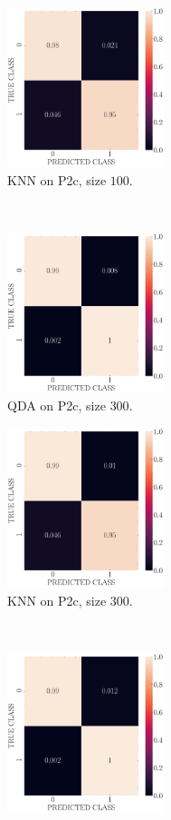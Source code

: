 \documentclass[11pt, a4 paper]{article}
\begin{document}
\begin{figure}[!htbp]
\begin{subfigure}[!htbp]{0.24\textwidth}
       \centering
       \includegraphics[width=1.8in]{../results/ex2/conf_mtx_KNN_dataset_P2c_size_100.pdf}
       \caption{KNN on P2c, size $100$.}
       \label{fig:KNN_rr20_P2c_100}
    \end{subfigure}
\\
    \begin{subfigure}[!htbp]{0.24\textwidth}
       \centering
       \includegraphics[width=1.8in]{../results/ex2/conf_mtx_QD_ML_dataset_P2c_size_300.pdf}
       \caption{QDA on P2c, size $300$.}
       \label{fig:QDA_rr20_P2c_300}
    \end{subfigure}
\quad    
    \begin{subfigure}[!htbp]{0.24\textwidth}
       \centering
       \includegraphics[width=1.8in]{../results/ex2/conf_mtx_KNN_dataset_P2c_size_300.pdf}
       \caption{KNN on P2c, size $300$.}
       \label{fig:KNN_rr20_P2c_300}
    \end{subfigure}
\\
    \begin{subfigure}[!htbp]{0.24\textwidth}
       \centering
       \includegraphics[width=1.8in]{../results/ex2/conf_mtx_QD_ML_dataset_P2c_size_999.pdf}

\end{subfigure}
\end{figure}
\end{document}
